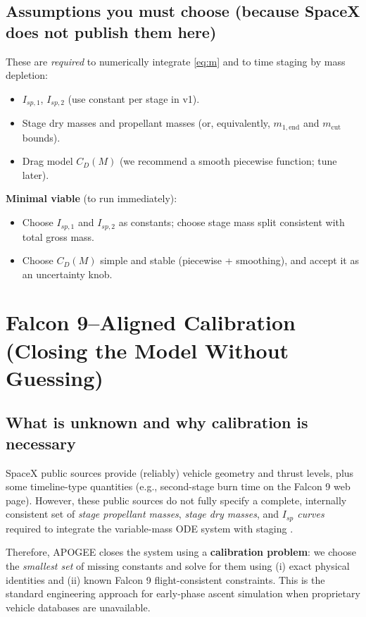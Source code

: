 \documentclass[11pt]{article}
\begin{document}
\subsection{Assumptions you must choose (because SpaceX does not publish them here)}
These are \emph{required} to numerically integrate \eqref{eq:m} and to time staging by mass depletion:
\begin{itemize}
\item $I_{sp,1}$, $I_{sp,2}$ (use constant per stage in v1).
\item Stage dry masses and propellant masses (or, equivalently, $m_{1,\text{end}}$ and $m_{\text{cut}}$ bounds).
\item Drag model $C_D(M)$ (we recommend a smooth piecewise function; tune later).
\end{itemize}

\textbf{Minimal viable} (to run immediately):
\begin{itemize}
\item Choose $I_{sp,1}$ and $I_{sp,2}$ as constants; choose stage mass split consistent with total gross mass.
\item Choose $C_D(M)$ simple and stable (piecewise + smoothing), and accept it as an uncertainty knob.
\end{itemize}

\section{Falcon 9--Aligned Calibration (Closing the Model Without Guessing)}

\subsection{What is unknown and why calibration is necessary}
SpaceX public sources provide (reliably) vehicle geometry and thrust levels, plus some timeline-type quantities (e.g., second-stage burn time on the Falcon 9 web page). However, these public sources do not fully specify a complete, internally consistent set of \emph{stage propellant masses}, \emph{stage dry masses}, and \emph{$I_{sp}$ curves} required to integrate the variable-mass ODE system with staging \cite{SpaceX_F9_Web,SpaceX_UsersGuide_2025}. 

Therefore, APOGEE closes the system using a \textbf{calibration problem}:
we choose the \emph{smallest set} of missing constants and solve for them using (i) exact physical identities and (ii) known Falcon 9 flight-consistent constraints. This is the standard engineering approach for early-phase ascent simulation when proprietary vehicle databases are unavailable.
\end{document}
